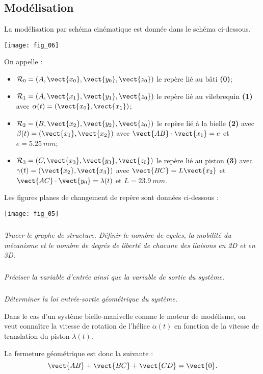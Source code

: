 \begin{multicols}{2}
\section*{Modélisation}
La modélisation par schéma cinématique est donnée dans le schéma ci-dessous. 
\begin{center}
\texttt{[image: fig\_06]}
\end{center}
On appelle : 
\begin{itemize}
\item $\mathcal{R}_0=\left(A,\vect{x_0},\vect{y_0},\vect{z_0} \right)$ le repère lié au bâti \textbf{(0)};
\item $\mathcal{R}_1=\left(A,\vect{x_1},\vect{y_1},\vect{z_0} \right)$ le repère lié au vilebrequin \textbf{(1)} avec $\alpha(t)=\left(\vect{x_0},\vect{x_1}\right)$;
\item $\mathcal{R}_2=\left(B,\vect{x_2},\vect{y_2},\vect{z_0} \right)$ le repère lié à la bielle \textbf{(2)} avec $\beta(t)=\left(\vect{x_1},\vect{x_2}\right)$ avec $\vect{AB}\cdot \vect{x_1}=e$ et $e=\SI{5,25}{mm}$;
\item $\mathcal{R}_3=\left(C,\vect{x_3},\vect{y_3},\vect{z_0} \right)$ le repère lié au piston \textbf{(3)} avec $\gamma(t)=\left(\vect{x_2},\vect{x_3}\right)$ avec $\vect{BC}=L\vect{x_2}$ et $\vect{AC}\cdot \vect{y_0}=\lambda(t)$ et $L=\SI{23,9}{mm}$.
\end{itemize}
Les figures planes de changement de repère sont données ci-dessous : 
\begin{center}
\texttt{[image: fig\_05]}
\end{center}

\subparagraph{}\textit{Tracer le graphe de structure. Définir le nombre de cycles, la mobilité du mécanisme et le nombre de degrés de liberté de chacune des liaisons en 2D et en 3D.}


\subparagraph{}\textit{Préciser la variable d'entrée ainsi que la variable de sortie du système.}

\subparagraph{}\textit{Déterminer la loi entrée-sortie géométrique du système.}
\ifprof 
\begin{corrige} 

Dans le cas d'un système bielle-manivelle comme le moteur de modélisme, on veut connaître la vitesse de rotation de l'hélice $\dot{\alpha}(t)$ en fonction de la vitesse de translation du piston $\dot{\lambda}(t)$. 

La fermeture géométrique est donc la suivante : 
$$\vect{AB} + \vect{BC} +\vect{CD} = \vect{0}.$$


\end{corrige}
\end{multicols}
